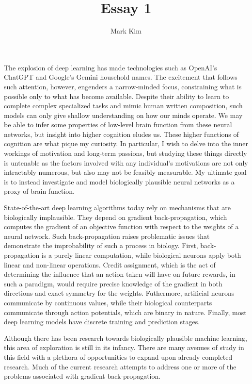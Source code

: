 \documentclass[12pt]{article}
\author{Mark Kim}
\title{Essay 1}
\begin{document}
\maketitle

The explosion of deep learning has made technologies such as OpenAI's ChatGPT
and Google's Gemini household names.  The excitement that follows such
attention, however, engenders a narrow-minded focus, constraining what is
possible only to what has become available.  Despite their ability
to learn to complete complex specialized tasks and mimic human written
composition, such models can only give shallow understanding on how our minds
operate. We may be able to infer some properties of low-level brain function
from these neural networks, but insight into higher cognition eludes us.  These higher
functions of cognition are what pique my curiosity.  In particular, I wish to
delve into the inner workings of motivation and long-term passions, but studying
these things directly is untenable as the factors involved with any individual's
motivations are not only intractably numerous, but also may not be feasibly
measurable.  My ultimate goal is to instead investigate and model biologically
plausible neural networks as a proxy of brain function.

State-of-the-art deep learning algorithms today rely on mechanisms that are
biologically implausible.  They depend on gradient back-propagation, which
computes the gradient of an objective function with respect to the weights of a
neural network.  Such back-propagation raises problematic issues that
demonstrate the improbability of such a process in biology.  First,
back-propagation is a purely linear computation, while biological neurons apply
both linear and non-linear operations. Credit assignment, which is the act of
determining the influence that an action taken will have on future rewards, in
such a paradigm, would require precise knowledge of the gradient in both
directions and exact symmetry for the weights.  Futhermore, artificial neurons
communicate by continuous values, while their biological counterparts
communicate through action potentials, which are binary in nature.  Finally,
most deep learning models have discrete training and prediction stages.

Although there has been research towards biologically plausible machine
learning, this area of exploration is still in its infancy.  There are many
avenues of study in this field with a plethora of opportunities to expand upon
already completed research.  Much of the current research attempts to address
one or more of the problems associated with gradient back-propagation.
\end{document}
